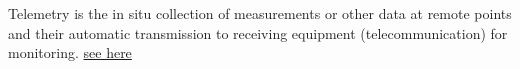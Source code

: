 \documentclass[a4paper]{article}
\title{}
\date{}
\newcommand{\seehere}[1]{\href{#1}{see here}}
\begin{document}
    \maketitle
    Telemetry is the in situ collection of measurements or other data at remote points and their automatic transmission to receiving equipment (telecommunication) for monitoring.
    \seehere{https://en.wikipedia.org/wiki/Telemetry}
\end{document}
